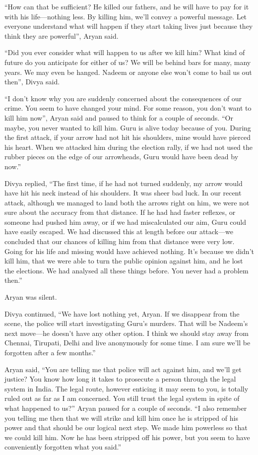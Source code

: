 “How can that be sufficient? He killed our fathers, and he will have to pay for
it with his life—nothing less. By killing him, we'll convey a powerful message.
Let everyone understand what will happen if they start taking lives just because
they think they are powerful”, Aryan said.

“Did you ever consider what will happen to us after we kill him? What kind of
future do you anticipate for either of us? We will be behind bars for many, many
years. We may even be hanged. Nadeem or anyone else won't come to bail us out
then”, Divya said.

“I don't know why you are suddenly concerned about the consequences of our
crime. You seem to have changed your mind. For some reason, you don't want to
kill him now”, Aryan said and paused to think for a couple of seconds. “Or
maybe, you never wanted to kill him. Guru is alive today because of you. During
the first attack, if your arrow had not hit his shoulders, mine would have
pierced his heart. When we attacked him during the election rally, if we had not
used the rubber pieces on the edge of our arrowheads, Guru would have been dead
by now.”

Divya replied, “The first time, if he had not turned suddenly, my arrow would
have hit his neck instead of his shoulders. It was sheer bad luck. In our recent
attack, although we managed to land both the arrows right on him, we were not
sure about the accuracy from that distance. If he had had faster reflexes, or someone
had pushed him away, or if we had miscalculated our aim, Guru could have easily
escaped. We had discussed this at length before our attack—we concluded
that our chances of killing him from that distance were very low. Going for his
life and missing would have achieved nothing. It's because we didn't kill him, that
we were able to turn the public opinion against him, and he lost the elections.
We had analysed all these things before. You never had a problem then.”

Aryan was silent.

Divya continued, “We have lost nothing yet, Aryan. If we disappear from the
scene, the police will start investigating Guru's murders. That will be Nadeem's
next move—he doesn't have any other option. I think we should stay away from
Chennai, Tirupati, Delhi and live anonymously for some time. I am sure we'll be
forgotten after a few months.”

Aryan said, “You are telling me that police will act against him, and we'll get
justice? You know how long it takes to prosecute a person through the legal
system in India. The legal route, however enticing it may seem to you,
is totally ruled out as far as I am concerned. You still trust the legal system
in spite of what happened to us?” Aryan paused for a couple of seconds. “I also
remember you telling me then that we will strike and kill him once he is
stripped of his power and that should be our logical next step. We made him
powerless so that we could kill him. Now he has been stripped off his power, but
you seem to have conveniently forgotten what you said.”

